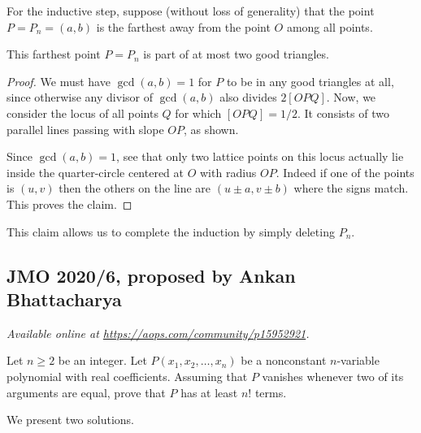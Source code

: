 \documentclass[11pt]{scrartcl}
\begin{document}
For the inductive step,
suppose (without loss of generality) that the point $P = P_n = (a,b)$
is the farthest away from the point $O$ among all points.
\begin{claim*}
  This farthest point $P = P_n$ is part of at most two good triangles.
\end{claim*}
\begin{proof}
  We must have $\gcd(a,b) = 1$ for $P$ to be in any good triangles at all,
  since otherwise any divisor of $\gcd(a,b)$ also divides $2[OPQ]$.
  Now, we consider the locus of all points $Q$ for which $[OPQ] = 1/2$.
  It consists of two parallel lines passing with slope $OP$, as shown.
  \begin{center}
  \end{center}
  Since $\gcd(a,b)=1$, see that only two lattice points on this locus
  actually lie inside the quarter-circle centered at $O$ with radius $OP$.
  Indeed if one of the points is $(u,v)$
  then the others on the line are $(u \pm a, v \pm b)$ where the signs match.
  This proves the claim.
\end{proof}
This claim allows us to complete the induction by simply deleting $P_n$.
\pagebreak

\subsection{JMO 2020/6, proposed by Ankan Bhattacharya}
\textsl{Available online at \url{https://aops.com/community/p15952921}.}
\begin{mdframed}[style=mdpurplebox,frametitle={Problem statement}]
Let $n \ge 2$ be an integer.
Let $P(x_1, x_2, \dots, x_n)$ be a nonconstant
$n$-variable polynomial with real coefficients.
Assuming that $P$ vanishes whenever two of its arguments are equal,
prove that $P$ has at least $n!$ terms.
\end{mdframed}
We present two solutions.
\end{document}
